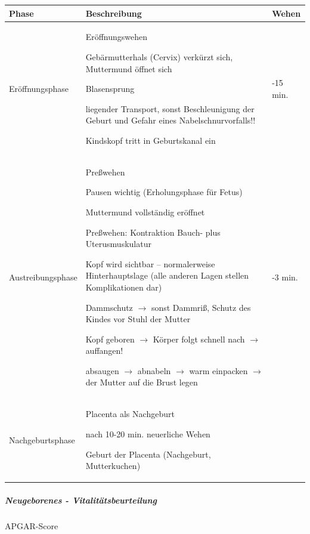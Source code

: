\documentclass{article}
\begin{document}
\begin{center}
\begin{tabular}{|m{3.12cm}|m{8.7890005cm}|m{1.1919999cm}|}
\hline
\centering Phase\par

 &
\centering Beschreibung\par

 &
\centering Wehen\par

\\\hline
Er\"offnungsphase

 &
Er\"offnungswehen

Geb\"armutterhals (Cervix) verk\"urzt sich,  Muttermund \"offnet sich

Blasensprung

liegender Transport, sonst Beschleunigung der  Geburt und  Gefahr eines 
Nabelschnurvorfalls!! 

Kindskopf tritt in Geburtskanal ein

 &
\centering 10-15 min.\par

\\\hline
Austreibungsphase

 &
Pre{\ss}wehen

Pausen wichtig (Erholungsphase f\"ur Fetus)

Muttermund vollst\"andig er\"offnet

Pre{\ss}wehen: Kontraktion Bauch- plus  Uterusmuskulatur

Kopf wird sichtbar -- normalerweise  Hinterhauptslage (alle anderen
Lagen stellen  Komplikationen dar)

Dammschutz ${\rightarrow}$ sonst Dammri{\ss}, Schutz des Kindes vor
Stuhl der Mutter

Kopf geboren ${\rightarrow}$ K\"orper folgt schnell nach ${\rightarrow}$
 auffangen!

absaugen ${\rightarrow}$ abnabeln ${\rightarrow}$ warm einpacken
${\rightarrow}$ der Mutter auf die Brust legen

 &
\centering 2-3 min.\par

\\\hline
Nachgeburtsphase

 &
Placenta als Nachgeburt

nach 10-20 min. neuerliche Wehen

Geburt der Placenta  (Nachgeburt,  Mutterkuchen)

 &
\\\hline
\end{tabular}
\end{center}
\subparagraph{Neugeborenes - Vitalit\"atsbeurteilung}
APGAR-Score
\end{document}
